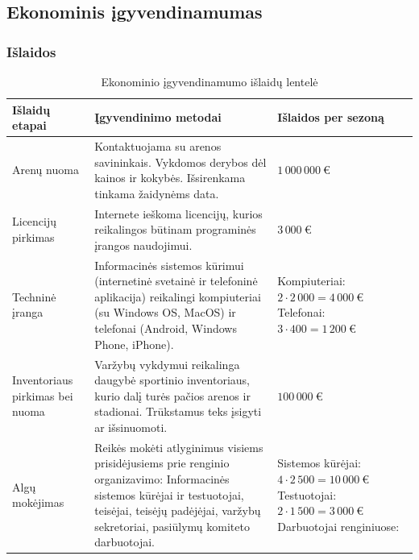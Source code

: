 \documentclass{VUMIFPSkursinis}
\begin{document}
  \subsection{Ekonominis įgyvendinamumas} \label{igyvendinamumoIrNaudosAnalize_ekonominis}
	\subsubsection*{Išlaidos}
		\begin{table}[H]
			\caption{Ekonominio įgyvendinamumo išlaidų lentelė}
			\label{table:ekonominisIgyvendinamumas_islaidos}
			\begin{tabularx} {.9\textwidth}{ | m{2cm} | m{7cm} | X |}
				\hline
					\textbf{Išlaidų etapai} & \textbf{Įgyvendinimo metodai} & \textbf{Išlaidos per sezoną} \\
				\hline 
					Arenų nuoma & Kontaktuojama su arenos savininkais. Vykdomos derybos dėl kainos ir kokybės. Išsirenkama tinkama žaidynėms data. &$ 1\,000\,000\ € $\\
				\hline
					Licencijų pirkimas & Internete ieškoma licencijų, kurios reikalingos būtinam programinės įrangos naudojimui. & $3\,000\ € $\\
				\hline
					Techninė įranga & Informacinės sistemos kūrimui (internetinė svetainė ir telefoninė aplikacija) reikalingi kompiuteriai (su Windows OS, MacOS) ir telefonai (Android, Windows Phone, iPhone). &
					Kompiuteriai: \newline
					$2 \cdot 2\,000 = 4\,000\ €$ \newline
					Telefonai: \newline
					$3 \cdot 400 = 1\,200\ €$ \\
				\hline
					Inventoriaus pirkimas bei nuoma & Varžybų vykdymui reikalinga daugybė sportinio inventoriaus, kurio dalį turės pačios arenos ir stadionai. Trūkstamus teks įsigyti ar išsinuomoti. & $100\,000\ €$ \\
				\hline
					Algų mokėjimas & Reikės mokėti atlyginimus visiems prisidėjusiems prie renginio organizavimo: Informacinės sistemos kūrėjai ir testuotojai, teisėjai, teisėjų padėjėjai, varžybų sekretoriai, pasiūlymų komiteto darbuotojai. &
					Sistemos kūrėjai: \newline
					$4 \cdot 2\,500 = 10\,000\ €$ \newline
					Testuotojai:\newline
					$2 \cdot  1\,500 = 3\,000\ €$\newline
					Darbuotojai renginiuose:\newline

\end{tabularx}
\end{table}
\end{document}
